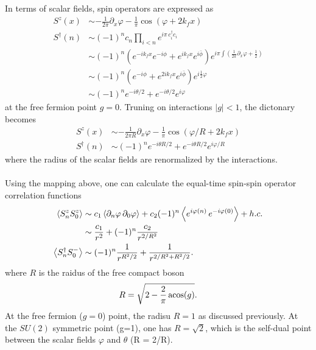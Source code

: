 In terms of scalar fields, spin operators are expressed as
\begin{equation}
	\begin{aligned}
		S^z(x) &\sim - \frac{1}{2\pi}\partial_x \varphi - \frac{1}{\pi}\cos (\varphi + 2k_f x) \\
		S^\dagger(n) &\sim \left(-1\right)^n c_n \prod_{i<n}e^{i\pi\,c_i^\dagger c_i} \\
		& \sim (-1)^n \left( e^{-ik_f x} e^{-i\phi} + e^{ik_f x}e^{i\bar{\phi}}\right) e^{i\pi \int \left(\frac{1}{2\pi}\partial_x \varphi + \frac{1}{2}\right)}\\
		&\sim (-1)^n \left( e^{-i\phi} + e^{2ik_f x} e^{i\bar{\phi}}\right) e^{i\frac{1}{2} \varphi}\\
		&\sim (-1)^n e^{-i\theta/2} + e^{-i\theta/2} e^{i\varphi}
	\end{aligned}
\end{equation}
at the free fermion point $g=0$. Truning on interactions $|g|<1$, the dictonary becomes
\begin{equation}
	\begin{aligned}
		S^z(x) &\sim - \frac{1}{2\pi R}\partial_x \varphi - \frac{1}{\pi}\cos (\varphi/R + 2k_f x) \\
		S^\dagger(n) &\sim (-1)^n e^{-i\theta R/2} + e^{-i\theta R /2} e^{i\varphi/R}
	\end{aligned}
\end{equation}
where the radius of the scalar fields are renormalized by the interactions. \\

 \\
Using the mapping above, one can calculate the equal-time spin-spin operator correlation functions
\begin{equation}
	\begin{aligned}
		\expval{S_n^z S^z_0} &\sim c_1 \left\langle\partial_n \varphi\, \partial_0 \varphi \right\rangle + c_2 (-1)^n \left\langle e^ {i\varphi(n)}\,e^{-i\varphi(0)}\right\rangle + h.c. \\ 
		& \sim \frac{c_1}{r^2} + (-1)^n\frac{c_2}{r^{2/R^2}} \\
		\expval{S^\dagger_n S^-_0} &\sim (-1)^n \frac{1}{r^{R^2/2}} + \frac{1}{r^{2/R^2+R^2/2}}. \\
	\end{aligned}
\end{equation}
where $R$ is the raidus of the free compact boson
\begin{equation}
	R = \sqrt{2-\frac{2}{\pi}\acosine (g)}.
\end{equation}
At the free fermion ($g=0$) point, the radisu $R=1$ as discussed previously. At the $SU(2)$ symmetric point (g=1), one has $R=\sqrt{2}$, which is the self-dual point between the scalar fields $\varphi$ and $\theta$ (R = 2/R).\\


